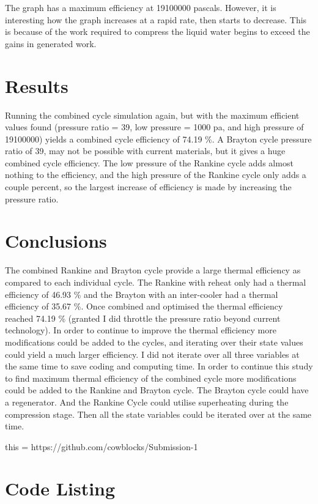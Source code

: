 \documentclass{article}
\begin{document}
\FloatBarrier

The graph has a maximum efficiency at 19100000 pascals. However, it is interesting how the graph increases at a rapid rate, then starts to decrease. This is because of the work required to compress the liquid water begins to exceed the gains in generated work.

\section{Results}

Running the combined cycle simulation again, but with the maximum efficient values found (pressure ratio = 39, low pressure = 1000 pa, and high pressure of 19100000) yields a combined cycle efficiency of 74.19 \%. A Brayton cycle pressure ratio of 39, may not be possible with current materials, but it gives a huge combined cycle efficiency. The low pressure of the Rankine cycle adds almost nothing to the efficiency, and the high pressure of the Rankine cycle only adds a couple percent, so the largest increase of efficiency is made by increasing the pressure ratio.

\section{Conclusions}

The combined Rankine and Brayton cycle provide a large thermal efficiency as compared to each individual cycle. The Rankine with reheat only had a thermal efficiency of 46.93 \% and the Brayton with an inter-cooler had a thermal efficiency of 35.67 \%. Once combined and optimised the thermal efficiency reached 74.19 \% (granted I did throttle the pressure ratio beyond current technology). In order to continue to improve the thermal efficiency more modifications could be added to the cycles, and iterating over their state values could yield a much larger efficiency. I did not iterate over all three variables at the same time to save coding and computing time. In order to continue this study to find maximum thermal efficiency of the combined cycle more modifications could be added to the Rankine and Brayton cycle. The Brayton cycle could have a regenerator. And the Rankine Cycle could utilise superheating during the compression stage. Then all the state variables could be iterated over at the same time.

\appendix

\FloatBarrier %




this = https://github.com/cowblocks/Submission-1

\section*{Code Listing}


\end{document}
